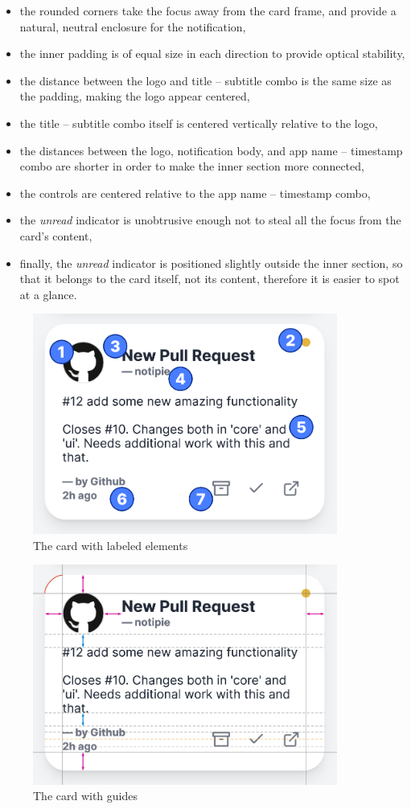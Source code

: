 \begin{itemize}
  \item
        the rounded corners take the focus away from the card frame,
        and provide a natural, neutral enclosure for the notification,
  \item
        the inner padding is of equal size in each direction
        to provide optical stability,
  \item
        the distance between the logo and title -- subtitle combo
        is the same size as the padding,
        making the logo appear centered,
  \item
        the title -- subtitle combo itself
        is centered vertically relative to the logo,
  \item
        the distances between the logo,
        notification body, and app name -- timestamp combo are shorter
        in order to make the inner section more connected,
  \item
        the controls are centered relative to the app name -- timestamp combo,
  \item
        the \textit{unread} indicator is unobtrusive enough
        not to steal all the focus from the card's content,
  \item
        finally, the \textit{unread} indicator
        is positioned slightly outside the inner section,
        so that it belongs to the card itself,
        not its content,
        therefore it is easier to spot at a glance.
\end{itemize}

\begin{figure}[p]
  \centering
  \includegraphics[width=10cm,keepaspectratio]{img/card_labeled.png}
  \caption{The card with labeled elements}
  \label{fig:card-with-labeled-elements}
\end{figure}

\begin{figure}[p]
  \centering
  \includegraphics[width=10cm,keepaspectratio]{img/card_guides.png}
  \caption{The card with guides}
  \label{fig:card-with-guides}
\end{figure}
